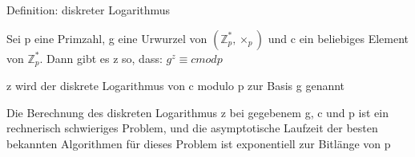 \documentclass[a4paper]{article}
\begin{document}
\begin{multicols}{3}
\begin{itemize*}
\begin{itemize*}
            \end{itemize*}
            \item Definition: diskreter Logarithmus
            \begin{itemize*}
                  \item Sei p eine Primzahl, g eine Urwurzel von $(\mathbb{Z}^*_p,\times_p)$ und c ein beliebiges Element von $\mathbb{Z}^*_p$. Dann gibt es z so, dass: $g^z\equiv c mod p$
                  \item z wird der diskrete Logarithmus von c modulo p zur Basis g genannt
                  \item Die Berechnung des diskreten Logarithmus z bei gegebenem g, c und p ist ein rechnerisch schwieriges Problem, und die asymptotische Laufzeit der besten bekannten Algorithmen für dieses Problem ist exponentiell zur Bitlänge von p
            \end{itemize*}
      \end{itemize*}


\end{multicols}
\end{document}

